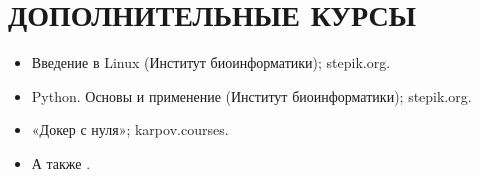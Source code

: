 \section{ДОПОЛНИТЕЛЬНЫЕ КУРСЫ}

    \begin{itemize}
        \setlength\itemsep{-.5em}
        \item Введение в Linux (Институт биоинформатики); stepik.org.
        \item Python. Основы и применение (Институт биоинформатики); stepik.org.
        \item «Докер с нуля»; karpov.courses.
        \item А также .
    \end{itemize}
    
    \vspace{-.4em}
